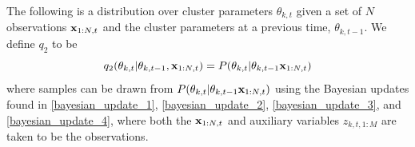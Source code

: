 \documentclass{article}
\begin{document}
The following is a distribution over cluster parameters $\theta_{k,t}$ given a set of $N$ observations $\bold{x}_{1:N, t}$ and the cluster parameters at a previous time, $\theta_{k,t-1}$. We define $q_{2}$ to be
\begin{equation}
\label{smc_q2_eqn}
q_{2}(\theta_{k,t} | \theta_{k,t-1},\bold{x}_{1:N,t}) = P(\theta_{k,t} | \theta_{k,t-1} \bold{x}_{1:N,t})
\end{equation}
where samples can be drawn from $P(\theta_{k,t} | \theta_{k,t-1} \bold{x}_{1:N,t})$ using the Bayesian updates found in \eqref{bayesian_update_1}, \eqref{bayesian_update_2}, \eqref{bayesian_update_3}, and \eqref{bayesian_update_4}, where both the $\bold{x}_{1:N,t}$ and auxiliary variables $z_{k,t,1:M}$ are taken to be the observations.


\end{document}
